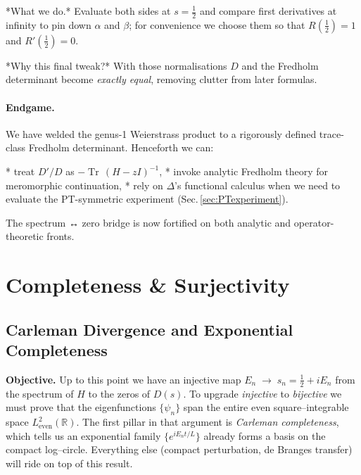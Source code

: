 \documentclass[11pt]{article}
\begin{document}
*What we do.*  
Evaluate both sides at $s=\tfrac12$ and compare first derivatives at
infinity to pin down $\alpha$ and $\beta$; for convenience we choose
them so that $R(\tfrac12)=1$ and $R'(\tfrac12)=0$.

*Why this final tweak?*  
With those normalisations $D$ and the Fredholm determinant become
\emph{exactly equal}, removing clutter from later formulas.

\vspace{0.6em}
\paragraph{Endgame.}
We have welded the genus-1 Weierstrass product to a rigorously defined
trace-class Fredholm determinant.  
Henceforth we can:

* treat $D'/D$ as $-\operatorname{Tr}\,(H-zI)^{-1}$,
* invoke analytic Fredholm theory for meromorphic continuation,
* rely on $\Delta$’s functional calculus when we need to evaluate the
  PT-symmetric experiment (Sec.\,\ref{sec:PTexperiment}).

The spectrum ↔ zero bridge is now fortified on both analytic and
operator-theoretic fronts.

\section{Completeness \& Surjectivity}
\label{sec:Surjectivity}

\subsection{Carleman Divergence and Exponential Completeness}
\label{sec:CarlemanNarrative}

\noindent
\textbf{Objective.}\;
Up to this point we have an injective map  
\(
   E_{n}\;\longrightarrow\;s_{n}=\tfrac12+iE_{n}
\)
from the spectrum of \(H\) to the zeros of \(D(s)\).
To upgrade \emph{injective} to \emph{bijective} we must prove that the
eigenfunctions \(\{\psi_{n}\}\) span the entire even square–integrable
space \(L^{2}_{\mathrm{even}}(\mathbb R)\).
The first pillar in that argument is \emph{Carleman completeness},
which tells us an exponential family
\(\{e^{iE_{n}t/L}\}\) already forms a basis on the compact
log–circle.  
Everything else (compact perturbation, de Branges transfer) will ride
on top of this result.
\end{document}

